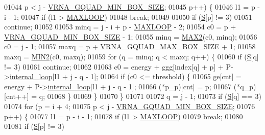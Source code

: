 \begin{DoxyCode}
01044        p < j - \mbox{\hyperlink{group__energy__parameters_gad7bdd880afca461f97763d79ee57a347}{VRNA\_GQUAD\_MIN\_BOX\_SIZE}};
01045        p++) \{
01046     l1 = p - i - 1;
01047     \textcolor{keywordflow}{if} (l1 > \mbox{\hyperlink{energy__const_8h_ad1bd6eabac419670ddd3c9ed82145988}{MAXLOOP}})
01048       \textcolor{keywordflow}{break};
01049 
01050     \textcolor{keywordflow}{if} (\mbox{\hyperlink{group__energy__parameters__rw_gga7bf2bb363bcf5ce50d60255d256e5682af1ce01387d2348f8b858721a7db81670}{S}}[p] != 3)
01051       \textcolor{keywordflow}{continue};
01052 
01053     minq  = j - i + p - \mbox{\hyperlink{energy__const_8h_ad1bd6eabac419670ddd3c9ed82145988}{MAXLOOP}} - 2;
01054     c0    = p + \mbox{\hyperlink{group__energy__parameters_gad7bdd880afca461f97763d79ee57a347}{VRNA\_GQUAD\_MIN\_BOX\_SIZE}} - 1;
01055     minq  = \mbox{\hyperlink{group__utils_ga33297b3679c713b0c4d897cd0fe3b122}{MAX2}}(c0, minq);
01056     c0    = j - 1;
01057     maxq  = p + \mbox{\hyperlink{group__energy__parameters_ga56cafabad2f8a7db83f2d5d3b0e8d313}{VRNA\_GQUAD\_MAX\_BOX\_SIZE}} + 1;
01058     maxq  = \mbox{\hyperlink{group__utils_gae0b9cd0ce090bd69b951aa73e8fa4f7d}{MIN2}}(c0, maxq);
01059     \textcolor{keywordflow}{for} (q = minq; q < maxq; q++) \{
01060       \textcolor{keywordflow}{if} (\mbox{\hyperlink{group__energy__parameters__rw_gga7bf2bb363bcf5ce50d60255d256e5682af1ce01387d2348f8b858721a7db81670}{S}}[q] != 3)
01061         \textcolor{keywordflow}{continue};
01062 
01063       c0 = energy + ggg[index[q] + p] + P->\mbox{\hyperlink{group__energy__parameters_a2a4fb2c65023ec371c9b96573da6d2fc}{internal\_loop}}[l1 + j - q - 1];
01064       \textcolor{keywordflow}{if} (c0 <= threshold) \{
01065         ge[cnt]       = energy + P->\mbox{\hyperlink{group__energy__parameters_a2a4fb2c65023ec371c9b96573da6d2fc}{internal\_loop}}[l1 + j - q - 1];
01066         (*p\_p)[cnt]   = p;
01067         (*q\_p)[cnt++] = q;
01068       \}
01069     \}
01070   \}
01071 
01072   q = j - 1;
01073   \textcolor{keywordflow}{if} (\mbox{\hyperlink{group__energy__parameters__rw_gga7bf2bb363bcf5ce50d60255d256e5682af1ce01387d2348f8b858721a7db81670}{S}}[q] == 3)
01074     \textcolor{keywordflow}{for} (p = i + 4;
01075          p < j - \mbox{\hyperlink{group__energy__parameters_gad7bdd880afca461f97763d79ee57a347}{VRNA\_GQUAD\_MIN\_BOX\_SIZE}};
01076          p++) \{
01077       l1 = p - i - 1;
01078       \textcolor{keywordflow}{if} (l1 > \mbox{\hyperlink{energy__const_8h_ad1bd6eabac419670ddd3c9ed82145988}{MAXLOOP}})
01079         \textcolor{keywordflow}{break};
01080 
01081       \textcolor{keywordflow}{if} (\mbox{\hyperlink{group__energy__parameters__rw_gga7bf2bb363bcf5ce50d60255d256e5682af1ce01387d2348f8b858721a7db81670}{S}}[p] != 3)

\end{DoxyCode}

